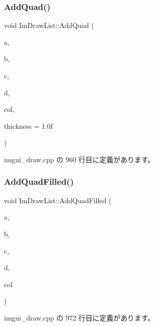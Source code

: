 \subsubsection{\texorpdfstring{Add\+Quad()}{AddQuad()}}
{\footnotesize\ttfamily void Im\+Draw\+List\+::\+Add\+Quad (\begin{DoxyParamCaption}\item[{const \mbox{\hyperlink{struct_im_vec2}{Im\+Vec2}} \&}]{a,  }\item[{const \mbox{\hyperlink{struct_im_vec2}{Im\+Vec2}} \&}]{b,  }\item[{const \mbox{\hyperlink{struct_im_vec2}{Im\+Vec2}} \&}]{c,  }\item[{const \mbox{\hyperlink{struct_im_vec2}{Im\+Vec2}} \&}]{d,  }\item[{\mbox{\hyperlink{imgui_8h_a118cff4eeb8d00e7d07ce3d6460eed36}{Im\+U32}}}]{col,  }\item[{float}]{thickness = {\ttfamily 1.0f} }\end{DoxyParamCaption})}



 imgui\+\_\+draw.\+cpp の 960 行目に定義があります。

\mbox{\label{struct_im_draw_list_abefdc71c2dc6b6331193aee3ff680ed0}} 
\subsubsection{\texorpdfstring{Add\+Quad\+Filled()}{AddQuadFilled()}}
{\footnotesize\ttfamily void Im\+Draw\+List\+::\+Add\+Quad\+Filled (\begin{DoxyParamCaption}\item[{const \mbox{\hyperlink{struct_im_vec2}{Im\+Vec2}} \&}]{a,  }\item[{const \mbox{\hyperlink{struct_im_vec2}{Im\+Vec2}} \&}]{b,  }\item[{const \mbox{\hyperlink{struct_im_vec2}{Im\+Vec2}} \&}]{c,  }\item[{const \mbox{\hyperlink{struct_im_vec2}{Im\+Vec2}} \&}]{d,  }\item[{\mbox{\hyperlink{imgui_8h_a118cff4eeb8d00e7d07ce3d6460eed36}{Im\+U32}}}]{col }\end{DoxyParamCaption})}



 imgui\+\_\+draw.\+cpp の 972 行目に定義があります。

